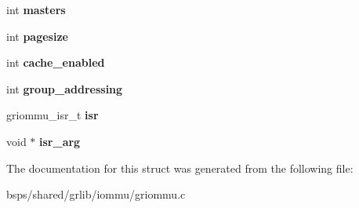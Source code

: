 \begin{DoxyCompactItemize}
int {\bfseries masters}
\item 
\mbox{\label{structgriommu__priv_aa0290a20890b160b4615f3681f0aff4a}} 
int {\bfseries pagesize}
\item 
\mbox{\label{structgriommu__priv_a0547c693de4711c04ea1e31ef7d7918d}} 
int {\bfseries cache\+\_\+enabled}
\item 
\mbox{\label{structgriommu__priv_a5c16969066db2819acf6ca03b4807ea8}} 
int {\bfseries group\+\_\+addressing}
\item 
\mbox{\label{structgriommu__priv_a6775fbe4130bdd84714f265cfb889540}} 
griommu\+\_\+isr\+\_\+t {\bfseries isr}
\item 
\mbox{\label{structgriommu__priv_a3ceff8778856fc76925090b7130a3c0a}} 
void $\ast$ {\bfseries isr\+\_\+arg}
\end{DoxyCompactItemize}


The documentation for this struct was generated from the following file\+:\begin{DoxyCompactItemize}
\item 
bsps/shared/grlib/iommu/griommu.\+c\end{DoxyCompactItemize}
